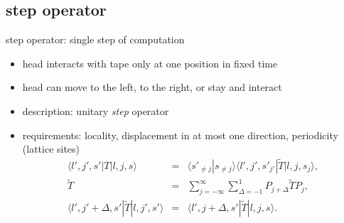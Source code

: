 \documentclass{beamer}
\begin{document}
\subsection{step operator}
\begin{frame}
    \begin{block}{step operator: single step of computation}
	    \begin{itemize}
    	    \item head interacts with tape only at one position in fixed time
        	\item head can move to the left, to the right, or stay and interact
	        \item description: unitary \emph{step} operator
    	    \item requirements: locality, displacement in at most one direction,
    	    periodicity (lattice sites)
        	\begin{eqnarray*}
            	\langle l',j',s'|T|l,j,s\rangle&=&\langle s'_{\neq j}|s_{\neq j}\rangle\langle
            	l',j',s'_{j'}|\tilde{T}|l,j,s_j\rangle,\\
            	\tilde{T}&=&\sum_{j=-\infty}^\infty\sum_{\Delta=-1}^1
            	P_{j+\Delta}\tilde{T}P_j,\\
            	\langle
            	l',j'+\Delta,s'|\tilde{T}|l,j',s'\rangle&=&\langle
            	l',j+\Delta,s'|\tilde{T}|l,j,s\rangle.
        	\end{eqnarray*}
    	\end{itemize}
    \end{block}
\end{frame}
%
\end{document}
